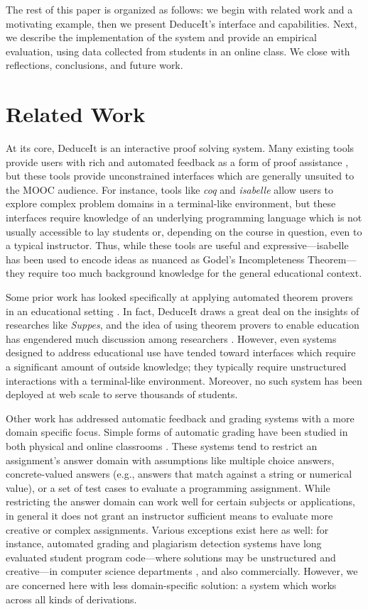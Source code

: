 \documentclass{sigchi}
\begin{document}
The rest of this paper is organized as follows: we begin with related work and a motivating example, then we present DeduceIt's interface and capabilities. Next, we describe the implementation of the system and provide an empirical evaluation, using data collected from students in an online class. We close with reflections, conclusions, and future work.

\section{Related Work}
At its core, DeduceIt is an interactive proof solving system. Many existing tools provide users with rich and automated feedback as a form of proof assistance \cite{coq,maude,isabelle, isabelle1,lisp-logic}, but these tools provide unconstrained interfaces which are generally unsuited to the MOOC audience. For instance, tools like \textit{coq} and \textit{isabelle} allow users to explore complex problem domains in a terminal-like environment, but these interfaces require knowledge of an underlying programming language which is not usually accessible to lay students or, depending on the course in question, even to a typical instructor. Thus, while these tools are useful and expressive---isabelle has been used to encode ideas as nuanced as Godel's Incompleteness Theorem---they require too much background knowledge for the general educational context.

Some prior work has looked specifically at applying automated theorem provers in an educational setting \cite{suppes, suppes-prover}. In fact, DeduceIt draws a great deal on the insights of researches like \textit{Suppes}, and the idea of using theorem provers to enable education has engendered much discussion among researchers \cite{automated-grading, automated-scoring-design}. However, even systems designed to address educational use have tended toward interfaces which require a significant amount of outside knowledge; they typically require unstructured interactions with a terminal-like environment. Moreover, no such system has been deployed at web scale to serve thousands of students.

Other work has addressed automatic feedback and grading systems with a more domain specific focus. Simple forms of automatic grading have been studied in both physical and online classrooms \cite{auto-grade}. These systems tend to restrict an assignment's answer domain with assumptions like multiple choice answers, concrete-valued answers (e.g., answers that match against a string or numerical value), or a set of test cases to evaluate a programming assignment. While restricting the answer domain can work well for certain subjects or applications, in general it does not grant an instructor sufficient means to evaluate more creative or complex assignments. Various exceptions exist here as well: for instance, automated grading and plagiarism detection systems have long evaluated student program code---where solutions may be unstructured and creative---in computer science departments \cite{grade-programs, moss}, and also commercially. However, we are concerned here with less domain-specific solution: a system which works across all kinds of derivations.
\end{document}
